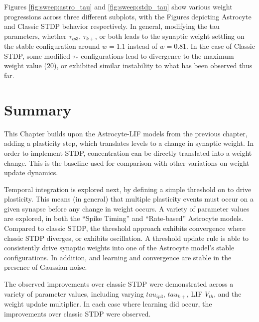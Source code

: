 
Figures \ref{fig:sweep:astro_tau} and \ref{fig:sweep:stdp_tau} show various
weight progressions across three different subplots, with the Figures
depicting Astrocyte and Classic STDP behavior respectively. In general,
modifying the tau parameters, whether $\tau_{ip3}$, $\tau_{k+}$, or both leads
to the synaptic weight settling on the stable configuration around $w=1.1$
instead of $w=0.81$. In the case of Classic STDP, some modified $\tau_*$
configurations lead to divergence to the maximum weight value ($20$), or
exhibited similar instability to what has been observed thus far.




\section{Summary}

This Chapter builds upon the Astrocyte-LIF models from the previous chapter,
adding a plasticity step, which translates \ca levels to a change
in synaptic weight. In order to implement STDP, \ca concentration can be directly
translated into a weight change. This is the baseline used for comparison with
other variations on weight update dynamics.

Temporal integration is explored next, by defining a simple threshold on
\ca to drive plasticity. This means (in general) that multiple plasticity events
must occur on a given synapse before any change in weight occurs. A variety of
parameter values are explored, in both the ``Spike Timing'' and ``Rate-based''
Astrocyte models. Compared to classic STDP, the threshold approach exhibits
convergence where classic STDP diverges, or exhibits oscillation. A threshold
update rule is able to consistently drive synaptic weights into one of the
Astrocyte model's stable configurations. In addition, and learning and
convergence are stable in the presence of Gaussian noise.

The observed improvements over classic STDP were demonstrated across a variety
of parameter values, including varying $tau_{ip3}$, $tau_{k+}$, LIF $V_{th}$,
and the weight update multiplier. In each case where learning did occur, the
improvements over classic STDP were observed.

